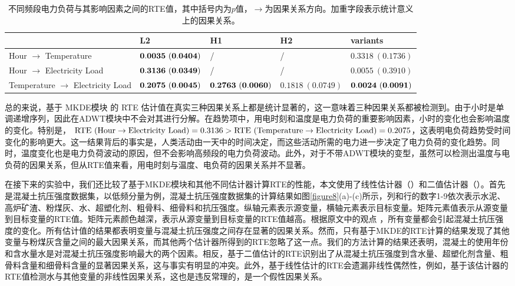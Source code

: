 \begin{table}[!ht]
\centering
\caption{不同频段电力负荷与其影响因素之间的RTE值，其中括号内为$p$值，$\rightarrow$为因果关系方向。加重字段表示统计意义上的因果关系。}
\fontsize{8}{14}\selectfont
\begin{tabular}{lllll}
 \hline
   & L2 &  H1& H2 & variants \\
  \hline
  Hour $\rightarrow$  Temperature & $\bf{0.0035\ (0.0404)}$ & /\ & /\ &$0.3318\ (0.1736)$\\
  \hline
  Hour $\rightarrow$ Electricity Load& $\bf{0.3136\ (0.0349)}$ & /\ & /\ &$ 0.0055\ (0.3910)$\\
  \hline
  Temperature $\rightarrow$ Electricity Load& $ \bf{0.2075\ (0.0045)}$ & $\bf{0.2763\ (0.0060)}$ & $0.1818\ (0.0749)$ & $\bf{0.0024\ (0.0091)}$\\
  \hline
\end{tabular}
\label{table5}
\end{table}
总的来说，基于 MKDE模块 的 RTE 估计值在真实三种因果关系上都是统计显著的，这一意味着三种因果关系都被检测到。由于小时是单调递增序列，因此在ADWT模块中不会对其进行分解。在趋势项中，用电时刻和温度是电力负荷的重要影响因素，小时的变化也会影响温度的变化。特别是， $\rm{RTE}~(\rm{Hour} \rightarrow \rm{Electricity\ Load}) = 0.3136 > \rm{RTE}~(\rm{Temperature} \rightarrow \rm{Electricity\ Load}) = 0.2075$，这表明电负荷趋势受时间变化的影响更大。这一结果背后的事实是，人类活动由一天中的时间决定，而这些活动所需的电力进一步决定了电力负荷的变化趋势。同时，温度变化也是电力负荷波动的原因，但不会影响高频段的电力负荷波动。此外，对于不带ADWT模块的变型，虽然可以检测出温度与电负荷的因果关系，但从RTE值来看，用电时刻与温度、电负荷的因果关系并不显著。

在接下来的实验中，我们还比较了基于MKDE模块和其他不同估计器计算RTE的性能，本文使用了线性估计器（\cite{3_31}）和二值估计器（\cite{3_32}）。首先是混凝土抗压强度数据集，以低频分量为例，混凝土抗压强度数据集的计算结果如图\ref{figure8}(a)-(c)所示，列和行的数字1-9依次表示水泥、高炉矿渣、粉煤灰、水、超塑化剂、粗骨料、细骨料和抗压强度。纵轴元素表示源变量，横轴元素表示目标变量。矩阵元素值表示从源变量到目标变量的RTE值。矩阵元素颜色越深，表示从源变量到目标变量的RTE值越高。根据原文中的观点 \cite{3_26}，所有变量都会引起混凝土抗压强度的变化。所有估计值的结果都表明变量与混凝土抗压强度之间存在显著的因果关系。然而，只有基于MKDE的RTE计算的结果发现了其他变量与粉煤灰含量之间的最大因果关系，而其他两个估计器所得到的RTE忽略了这一点。我们的方法计算的结果还表明，混凝土的使用年份和含水量水是对混凝土抗压强度影响最大的两个因素。相反，基于二值估计的RTE识别出了从混凝土抗压强度到含水量、超塑化剂含量、粗骨料含量和细骨料含量的显著因果关系，这与事实有明显的冲突。此外，基于线性估计的RTE会遗漏非线性偶然性，例如，基于该估计器的RTE值检测水与其他变量的非线性因果关系，这也是违反常理的，是一个假性因果关系。


